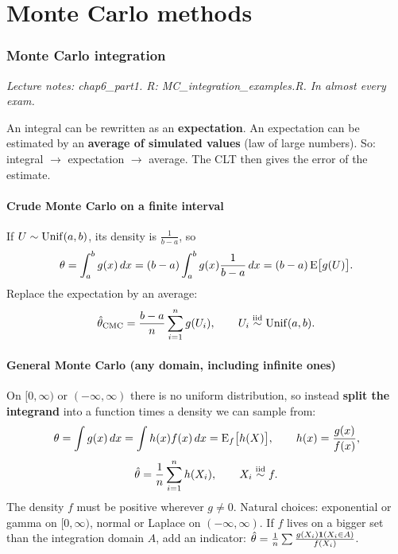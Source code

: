 \part{Monte Carlo methods}

\section{Monte Carlo integration}
\textit{Lecture notes: chap6\_part1. R: MC\_integration\_examples.R. In almost every exam.}

\begin{idea}
An integral can be rewritten as an \textbf{expectation}. An expectation can be estimated by an \textbf{average of simulated values} (law of large numbers). So: integral $\to$ expectation $\to$ average. The CLT then gives the error of the estimate.
\end{idea}

\subsection{Crude Monte Carlo on a finite interval}
If $U\sim\mathrm{Unif}(a,b)$, its density is $\frac1{b-a}$, so
\[
\theta = \int_a^b g(x)\,dx = (b-a)\int_a^b g(x)\frac{1}{b-a}\,dx = (b-a)\,\mathrm{E}\big[g(U)\big].
\]
Replace the expectation by an average:
\[
\hat\theta_{\text{CMC}} = \frac{b-a}{n}\sum_{i=1}^n g(U_i), \qquad U_i\overset{\text{iid}}{\sim}\mathrm{Unif}(a,b).
\]

\subsection{General Monte Carlo (any domain, including infinite ones)}
On $[0,\infty)$ or $(-\infty,\infty)$ there is no uniform distribution, so instead \textbf{split the integrand} into a function times a density we can sample from:
\[
\theta = \int g(x)\,dx = \int h(x)f(x)\,dx = \mathrm{E}_f\big[h(X)\big], \qquad h(x) = \frac{g(x)}{f(x)},
\]
\[
\hat\theta = \frac1n\sum_{i=1}^n h(X_i), \qquad X_i\overset{\text{iid}}{\sim} f.
\]
The density $f$ must be positive wherever $g\ne0$. Natural choices: exponential or gamma on $[0,\infty)$, normal or Laplace on $(-\infty,\infty)$. If $f$ lives on a bigger set than the integration domain $A$, add an indicator: $\hat\theta = \frac1n\sum\frac{g(X_i)\mathbf{1}(X_i\in A)}{f(X_i)}$.

